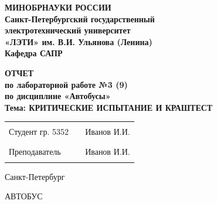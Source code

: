\documentclass[12pt]{extarticle}
\begin{document}
\begin{center}
  \textbf{МИНОБРНАУКИ РОССИИ} \\
  \textbf{Санкт-Петербургский государственный} \\
  \textbf{электротехнический университет} \\
  \textbf{«ЛЭТИ» им. В.И. Ульянова (Ленина)} \\
  \textbf{Кафедра САПР} \\
\end{center}

\vspace{0.25\textheight}

\begin{center}
\textbf{ОТЧЕТ} \\
\textbf{по лабораторной работе №3 (9)} \\
\textbf{по дисциплине «Автобусы»} \\
\textbf{Тема: КРИТИЧЕСКИЕ ИСПЫТАНИЕ И КРАШТЕСТ} \\
\end{center}

\vspace*{\fill}

\begin{center}
\begin{tabularx}{\textwidth}{ l X r }
 Студент гр. 5352 & \rule{8cm}{0.2mm} & Иванов И.И. \\
 Преподаватель & \rule{8cm}{0.2mm} & Иванов И.И. \\
\end{tabularx}
\end{center}

\vspace{3em}

\begin{center}
Санкт-Петербург\\
\the\year
\end{center}

\thispagestyle{empty}

\pagebreak

АВТОБУС
\end{document}
